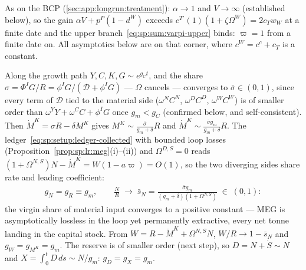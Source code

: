  As on the BCP (\ref{sec:app:longrun:treatment}):
$\alpha\to1$ and $V\to\infty$ (established below), so the gain
$\alpha V+p^P\left(1-d^W\right)$ exceeds
$c^{T\prime}\left(1\right)\left(1+\zeta\Omega^W\right)=2c_Tw_W$ at a finite date and the upper
branch~\eqref{eq:sp:sum:varpi-upper} binds: $\varpi=1$ from a finite date on. All asymptotics
below are on that corner, where $c^W=c^c+c_T$ is a constant.

 Along the growth path
$Y,C,K,G\sim e^{g_Ct}$, and the share
$\sigma=\Phi^IG/R=\phi^IG/\left(\mathcal D+\phi^IG\right)$ --- $\Omega$ cancels --- converges
to $\bar\sigma\in\left(0,1\right)$, since every term of $\mathcal D$ tied to the material side
($\omega^NC^N$, $\omega^DC^D$, $\omega^WC^W$) is of smaller order than
$\omega^YY+\omega^CC+\phi^IG$ once $g_m<g_C$ (confirmed below, and self-consistent). Then
$\dot M^K=\sigma R-\delta M^K$ gives $M^K\sim\frac{\bar\sigma}{g_m+\delta}R$ and
$\dot M^K\sim\frac{\bar\sigma g_m}{g_m+\delta}R$. The
ledger~\eqref{eq:sp:setup:ledger-collected} with bounded loop losses
(Proposition~\ref{prop:sp:lr:meg}(i)--(ii)) and $\Omega^{D,S}=0$ reads
$\left(1+\Omega^{N,S}\right)N-\dot M^K=W\left(1-a\varpi\right)=O\left(1\right)$, so the two
diverging sides share rate and leading coefficient:
\begin{align}
g_N=g_R\equiv g_m,
\qquad
\frac{N}{R}\;\to\;\bar s_N=\frac{\bar\sigma g_m}{\left(g_m+\delta\right)\left(1+\Omega^{N,S}\right)}
\;\in\;\left(0,1\right):
\label{eq:app:wh:meg:share}
\end{align}
the virgin share of material input converges to a positive constant --- MEG is asymptotically
lossless in the loop yet permanently extractive, every net tonne landing in the capital stock.
From $W=R-\dot M^K+\Omega^{N,S}N$, $W/R\to1-\bar s_N$ and $g_W=g_{M^K}=g_m$. The reserve is of
smaller order (next step), so $D=N+\dot S\sim N$ and $X=\int_0^tD\,ds\sim N/g_m$:
$g_D=g_X=g_m$.


